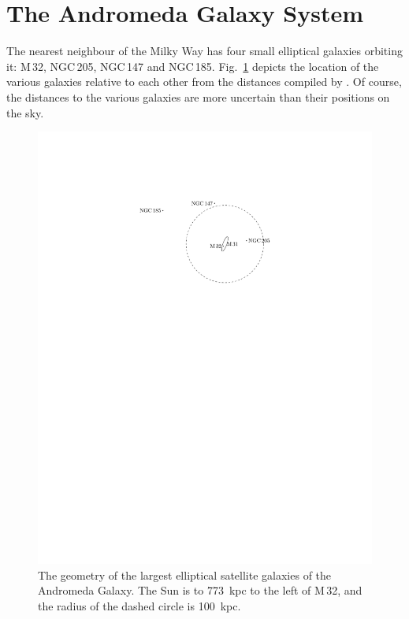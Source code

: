 \documentclass[useAMS,usenatbib]{mn2e}
\begin{document}
\section{The Andromeda Galaxy System}

The nearest neighbour of the Milky Way has four small elliptical
galaxies orbiting it: M\,32, NGC\,205, NGC\,147 and NGC\,185.
Fig.~\ref{fig:M31-system} depicts the location of the various galaxies
relative to each other from the distances compiled by
\citet{2006AJ....131.1405K}.  Of course, the distances to the various
galaxies are more uncertain than their positions on the sky.
\begin{figure}
  \includegraphics[width=\columnwidth,clip,trim=2.5in 7in 2.5in 1.7in]{m31}
  \caption{The geometry of the largest elliptical satellite galaxies
    of the Andromeda Galaxy. The Sun is to 773~kpc to the left of
    M\,32, and the radius of the dashed circle is 100~kpc.}
  \label{fig:M31-system}
\end{figure}
\end{document}
